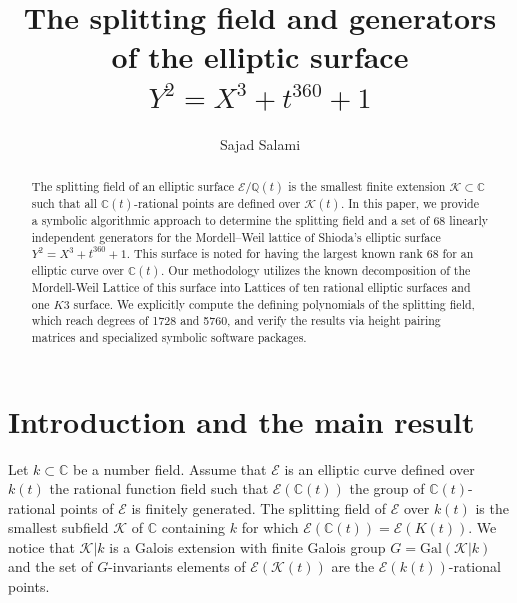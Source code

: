 \documentclass[11pt]{amsart}
\newcommand{\CC}{{\mathbb C}}
\newcommand{\Ee}{{\mathcal E}}
\newcommand{\KK}{{\mathcal K}}
\newcommand{\gal}{{\text{Gal}}}
\numberwithin{equation}{section}
\numberwithin{table}{section}
\newcommand\<{\langle}
\begin{document}
\title{The splitting field and generators of the  elliptic surface  $Y^2=X^3 +t^{360} +1$}

\author{Sajad Salami}
\address{Institute of Mathematics and Statistics, Rio de Janeiro State University, Rio de Janeiro, RJ, Brazil}

\date{}

\newcommand{\I}{{\rm{i}}}


\begin{abstract}
The splitting field of an elliptic surface $\mathcal{E}/\mathbb{Q}(t)$ is the smallest finite extension $\mathcal{K} \subset \mathbb{C}$ such that all $\mathbb{C}(t)$-rational points are defined over $\mathcal{K}(t)$. In this paper, we provide a symbolic algorithmic approach to determine the splitting field and a set of $68$ linearly independent generators for the Mordell--Weil lattice of Shioda's elliptic surface $Y^2=X^3 +t^{360} +1$. This surface is noted for having the largest known rank 68 for an elliptic curve over $\mathbb{C}(t)$.
 Our methodology utilizes the known decomposition of the Mordell-Weil Lattice of this surface into Lattices of    ten rational elliptic surfaces and one $K3$ surface. We explicitly compute the defining polynomials of the splitting field, which reach degrees of 1728 and 5760, and verify the results via height pairing matrices and specialized symbolic software packages.
\end{abstract}
	




\maketitle
 


\section{Introduction and the main result}

Let $k \subset  \CC$ be a number field.
Assume that $\Ee$ is an elliptic curve defined over $k(t)$ the rational function field such that 
$\Ee(\CC(t))$ the group of   $\CC(t)$-rational points of $\Ee$ is finitely generated.
The {\sf splitting field}
of $\Ee$ over $k(t)$  is the smallest subfield $\KK$ of $\CC$ containing $k$ 
for which  $\Ee (\CC (t))=\Ee (K(t))$. 
We notice that  $\KK| k$ is a Galois  extension with  finite Galois group  $G=\gal(\KK | k)$
and  the set of $G$-invariants elements of $\Ee (\KK(t))$ are the $\Ee (k(t))$-rational points.
\end{document}
